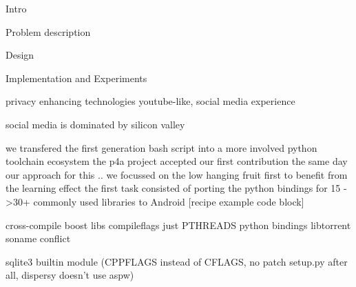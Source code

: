 Intro


Problem description


Design


Implementation and Experiments




privacy enhancing technologies
youtube-like, social media experience

social media is dominated by silicon valley

we transfered the first generation bash script into a more involved python toolchain ecosystem
the p4a project accepted our first contribution the same day
our approach for this .. we focussed on the low hanging fruit first to benefit from the learning effect
the first task consisted of porting the python bindings for 15 ->30+ commonly used libraries to Android [recipe example code block]

cross-compile boost libs compileflags just PTHREADS
python bindings libtorrent soname conflict


sqlite3 builtin module (CPPFLAGS instead of CFLAGS, no patch setup.py after all, dispersy doesn't use aspw)